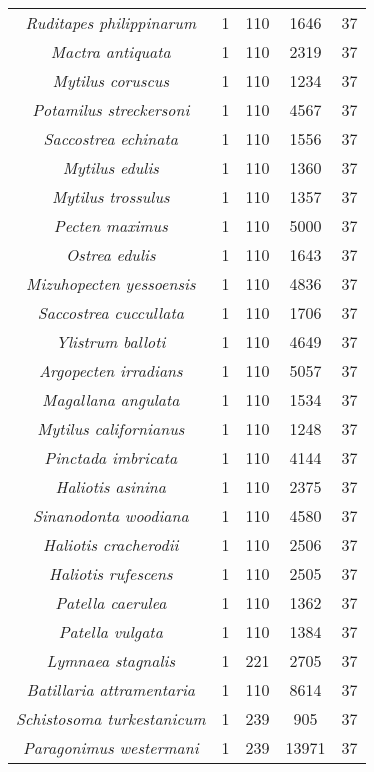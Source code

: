 \begin{longtable}[c]{|c|c|c|c|c|}
\textit{Ruditapes philippinarum}   & 1  & 110 & 1646  & 37 \\
\textit{Mactra antiquata}          & 1  & 110 & 2319  & 37 \\
\textit{Mytilus coruscus}          & 1  & 110 & 1234  & 37 \\
\textit{Potamilus streckersoni}    & 1  & 110 & 4567  & 37 \\
\textit{Saccostrea echinata}       & 1  & 110 & 1556  & 37 \\
\textit{Mytilus edulis}            & 1  & 110 & 1360  & 37 \\
\textit{Mytilus trossulus}         & 1  & 110 & 1357  & 37 \\
\textit{Pecten maximus}            & 1  & 110 & 5000  & 37 \\
\textit{Ostrea edulis}             & 1  & 110 & 1643  & 37 \\
\textit{Mizuhopecten yessoensis}   & 1  & 110 & 4836  & 37 \\
\textit{Saccostrea cuccullata}     & 1  & 110 & 1706  & 37 \\
\textit{Ylistrum balloti}          & 1  & 110 & 4649  & 37 \\
\textit{Argopecten irradians}      & 1  & 110 & 5057  & 37 \\
\textit{Magallana angulata}        & 1  & 110 & 1534  & 37 \\
\textit{Mytilus californianus}     & 1  & 110 & 1248  & 37 \\
\textit{Pinctada imbricata}        & 1  & 110 & 4144  & 37 \\
\textit{Haliotis asinina}          & 1  & 110 & 2375  & 37 \\
\textit{Sinanodonta woodiana}      & 1  & 110 & 4580  & 37 \\
\textit{Haliotis cracherodii}      & 1  & 110 & 2506  & 37 \\
\textit{Haliotis rufescens}        & 1  & 110 & 2505  & 37 \\
\textit{Patella caerulea}          & 1  & 110 & 1362  & 37 \\
\textit{Patella vulgata}           & 1  & 110 & 1384  & 37 \\
\textit{Lymnaea stagnalis}         & 1  & 221 & 2705  & 37 \\
\textit{Batillaria attramentaria}  & 1  & 110 & 8614  & 37 \\
\textit{Schistosoma turkestanicum} & 1  & 239 & 905   & 37 \\
\textit{Paragonimus westermani}    & 1  & 239 & 13971 & 37 \\

\end{longtable}
